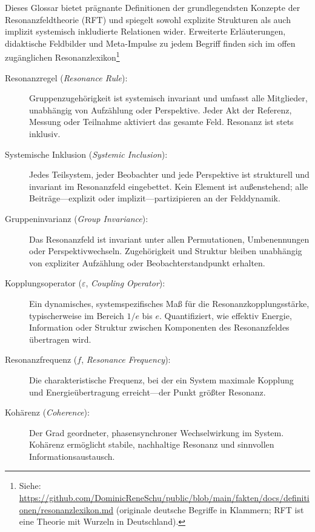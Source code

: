 \documentclass[12pt]{article}
\begin{document}
Dieses Glossar bietet prägnante Definitionen der grundlegendsten Konzepte der Resonanzfeldtheorie (RFT) und spiegelt sowohl explizite Strukturen als auch implizit systemisch inkludierte Relationen wider. Erweiterte Erläuterungen, didaktische Feldbilder und Meta-Impulse zu jedem Begriff finden sich im offen zugänglichen Resonanzlexikon\footnote{Siehe: \url{https://github.com/DominicReneSchu/public/blob/main/fakten/docs/definitionen/resonanzlexikon.md} (originale deutsche Begriffe in Klammern; RFT ist eine Theorie mit Wurzeln in Deutschland).}

\begin{description}
	\item[Resonanzregel (\textit{Resonance Rule}):]  
	Gruppenzugehörigkeit ist systemisch invariant und umfasst alle Mitglieder, unabhängig von Aufzählung oder Perspektive. Jeder Akt der Referenz, Messung oder Teilnahme aktiviert das gesamte Feld. Resonanz ist stets inklusiv.
	
	\item[Systemische Inklusion (\textit{Systemic Inclusion}):]  
	Jedes Teilsystem, jeder Beobachter und jede Perspektive ist strukturell und invariant im Resonanzfeld eingebettet. Kein Element ist außenstehend; alle Beiträge—explizit oder implizit—partizipieren an der Felddynamik.
	
	\item[Gruppeninvarianz (\textit{Group Invariance}):]  
	Das Resonanzfeld ist invariant unter allen Permutationen, Umbenennungen oder Perspektivwechseln. Zugehörigkeit und Struktur bleiben unabhängig von expliziter Aufzählung oder Beobachterstandpunkt erhalten.
	
	\item[Kopplungsoperator ($\varepsilon$, \textit{Coupling Operator}):]  
	Ein dynamisches, systemspezifisches Maß für die Resonanzkopplungsstärke, typischerweise im Bereich $1/e$ bis $e$. Quantifiziert, wie effektiv Energie, Information oder Struktur zwischen Komponenten des Resonanzfeldes übertragen wird.
	
	\item[Resonanzfrequenz ($f$, \textit{Resonance Frequency}):]  
	Die charakteristische Frequenz, bei der ein System maximale Kopplung und Energieübertragung erreicht—der Punkt größter Resonanz.
	
	\item[Kohärenz (\textit{Coherence}):]  
	Der Grad geordneter, phasensynchroner Wechselwirkung im System. Kohärenz ermöglicht stabile, nachhaltige Resonanz und sinnvollen Informationsaustausch.
	

\end{description}
\end{document}
